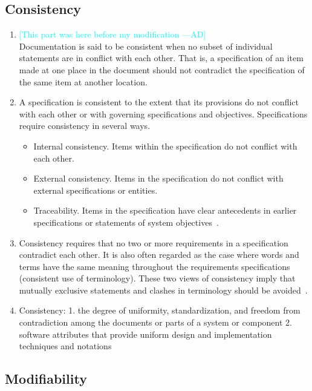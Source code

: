 \documentclass[letterpaper,cleveref]{lipics-v2019}
\newcommand{\authornote}[3]{\textcolor{#1}{[#3 ---#2]}}
\newcommand{\authornote}[3]{}
\newcommand{\ad}[1]{\authornote{cyan}{AD}{#1}} %
\theoremstyle{definition}
\begin{document}
\subsection{Consistency}
\begin{enumerate}[(1).]
    \item
    \ad{This part was here before my modification}\\
    Documentation is said to be consistent when no subset of individual statements are in conflict with each other. That is, a specification of an item made at one place in the document should not contradict the specification of the same item at another location.

    \item    A specification is consistent to the extent that its provisions do not conflict with each other or with governing specifications and objectives. Specifications require consistency in several ways.
    \begin{itemize}
        \item Internal consistency. Items within the specification do not conflict with each other.
        \item External consistency. Items in the specification do not conflict with external specifications or entities.
        \item Traceability. Items in the specification have clear antecedents in earlier specifications or statements of system objectives~\cite{Boehm1984}.
    \end{itemize}
    \item Consistency requires that no two or more requirements in a specification contradict each other. It is also often regarded as the case where words and terms have the same meaning throughout the requirements specifications (consistent use of terminology). These two views of consistency imply that mutually exclusive statements and clashes in terminology should be avoided~\cite{ZOWGHI2003}.
    \item Consistency: 1. the degree of uniformity, standardization, and freedom from contradiction among the documents or parts of a system or component 2. software attributes that provide uniform design and implementation techniques and notations~\cite{ISO/IEC/IEEE24765}
\end{enumerate}

\subsection{Modifiability}
\end{document}
